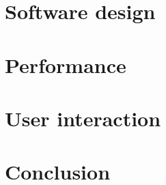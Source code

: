 \documentclass[%
 aip,
superscriptaddress,
 amsmath,amssymb,
preprint,%
]{revtex4-2}
\begin{document}
\section{Software design}


\section{Performance}



\section{User interaction}


\section{Conclusion}




\end{document}
